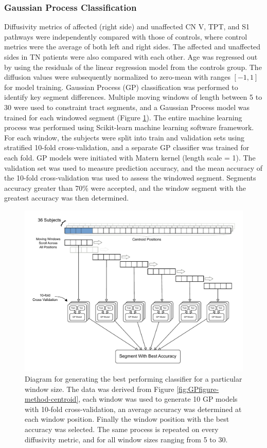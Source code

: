 \subsubsection{Gaussian Process Classification}

Diffusivity metrics of affected (right side) and unaffected CN V, TPT, and S1 pathways were independently compared with those of controls, where control metrics were the average of both left and right sides. The affected and unaffected sides in TN patients were also compared with each other. 
Age was regressed out by using the residuals of the linear regression model from the controls group. The diffusion values were subsequently normalized to zero-mean with ranges $[-1, 1]$ for model training. 
Gaussian Process (GP) classification was performed to identify key segment differences. Multiple moving windows of length between 5 to 30 were used to constraint tract segments, and a Gaussian Process model was trained for each windowed segment (Figure \ref{fig:GPfigure-gp-train}). The entire machine learning process was performed using Scikit-learn machine learning software framework.
For each window, the subjects were split into train and validation sets using stratified 10-fold cross-validation, and a separate GP classifier was trained for each fold. GP models were initiated with Matern kernel (length scale = 1). The validation set was used to measure prediction accuracy, and the mean accuracy of the 10-fold cross-validation was used to assess the windowed segment. Segments accuracy greater than 70\% were accepted, and the window segment with the greatest accuracy was then determined. 

\begin{figure}[ht]
\centering
\includegraphics[width=\linewidth]{thesis/images/tn-gp-sagit/figure-GP-training.pdf}
\caption{Diagram for generating the best performing classifier for a particular window size. The data was derived from Figure \ref{fig:GPfigure-method-centroid}, each window was used to generate 10 GP models with 10-fold cross-validation, an average accuracy was determined at each window position. Finally the window position with the best accuracy was selected. The same process is repeated on every diffusivity metric, and for all window sizes ranging from 5 to 30. }
\label{fig:GPfigure-gp-train}
\end{figure}


